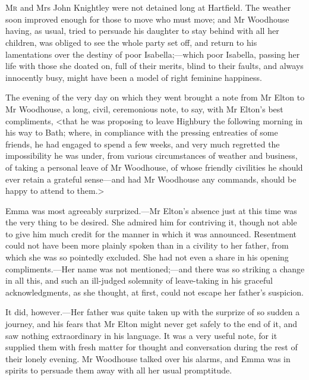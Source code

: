 \chapter[Chapter \thechapter]{}
\lettrine[lraise=0.3]{M}{r} and Mrs John Knightley were not detained long at Hartfield. The weather soon improved enough for those to move who must move; and Mr Woodhouse having, as usual, tried to persuade his daughter to stay behind with all her children, was obliged to see the whole party set off, and return to his lamentations over the destiny of poor Isabella;—which poor Isabella, passing her life with those she doated on, full of their merits, blind to their faults, and always innocently busy, might have been a model of right feminine happiness.

The evening of the very day on which they went brought a note from Mr Elton to Mr Woodhouse, a long, civil, ceremonious note, to say, with Mr Elton's best compliments, <that he was proposing to leave Highbury the following morning in his way to Bath; where, in compliance with the pressing entreaties of some friends, he had engaged to spend a few weeks, and very much regretted the impossibility he was under, from various circumstances of weather and business, of taking a personal leave of Mr Woodhouse, of whose friendly civilities he should ever retain a grateful sense—and had Mr Woodhouse any commands, should be happy to attend to them.>

Emma was most agreeably surprized.—Mr Elton's absence just at this time was the very thing to be desired. She admired him for contriving it, though not able to give him much credit for the manner in which it was announced. Resentment could not have been more plainly spoken than in a civility to her father, from which she was so pointedly excluded. She had not even a share in his opening compliments.—Her name was not mentioned;—and there was so striking a change in all this, and such an ill-judged solemnity of leave-taking in his graceful acknowledgments, as she thought, at first, could not escape her father's suspicion.

It did, however.—Her father was quite taken up with the surprize of so sudden a journey, and his fears that Mr Elton might never get safely to the end of it, and saw nothing extraordinary in his language. It was a very useful note, for it supplied them with fresh matter for thought and conversation during the rest of their lonely evening. Mr Woodhouse talked over his alarms, and Emma was in spirits to persuade them away with all her usual promptitude.

